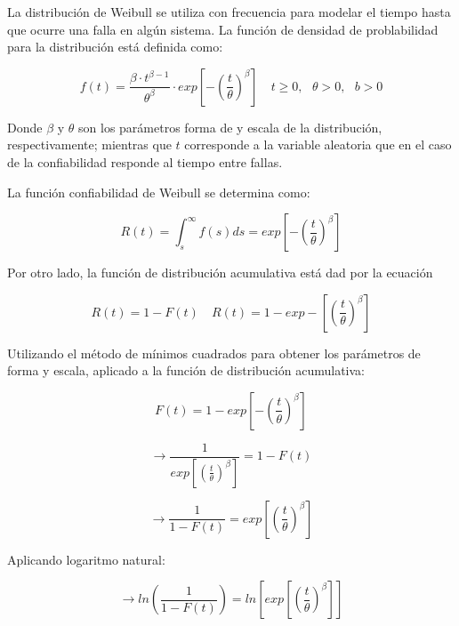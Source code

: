La distribución de Weibull se utiliza con frecuencia para modelar el tiempo hasta que ocurre una falla en algún sistema. La función de densidad de problabilidad para la distribución está definida como:

\begin{equation}
f(t)=\frac{\beta\cdot t^{\beta-1}}{\theta^\beta}\cdot exp\left[-\left(\frac{t}{\theta}\right)^\beta\right] \quad t\geq 0,\text{ }\theta>0,\text{ }b>0 
\end{equation}

Donde $\beta$ y $\theta$ son los parámetros forma de y escala de la distribución, respectivamente; mientras que $t$ corresponde a la variable aleatoria que en el caso de la confiabilidad responde al tiempo entre fallas.

La función confiabilidad de Weibull se determina como:

\begin{equation}
R(t)=\int_{s}^{\infty}f(s)ds= exp\left[-\left(\frac{t}{\theta}\right)^\beta\right]
\end{equation}

Por otro lado, la función de distribución acumulativa está dad por la ecuación

\begin{equation}
R(t)=1-F(t)\quad R(t)=1-exp-\left[\left( \frac{t}{\theta}\right)^\beta\right]
\end{equation}

Utilizando el método de mínimos cuadrados para obtener los parámetros de forma y escala, aplicado a la función de distribución acumulativa:

\begin{equation}
F(t)=1-exp\left[-\left(\frac{t}{\theta}\right)^\beta\right]
\end{equation}

\begin{equation}
\rightarrow \frac{1}{exp \left[\left(\frac{t}{\theta}\right)^\beta\right]}=1-F(t)
\end{equation}

\begin{equation}
\rightarrow \frac{1}{1-F(t)}=exp\left[\left(\frac{t}{\theta}\right)^\beta\right]
\end{equation}

Aplicando logaritmo natural:

\begin{equation}
\rightarrow ln\left(\frac{1}{1-F(t)}\right)=ln\left[exp\left[\left(\frac{t}{\theta}\right)^\beta \right]\right]
\end{equation}

